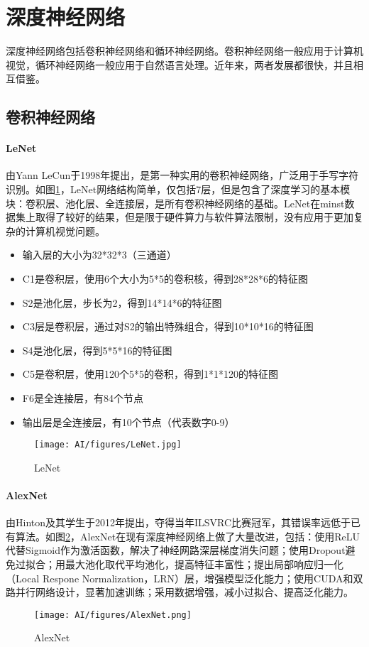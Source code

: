 \section{深度神经网络}
深度神经网络包括卷积神经网络和循环神经网络。卷积神经网络一般应用于计算机视觉，循环神经网络一般应用于自然语言处理。近年来，两者发展都很快，并且相互借鉴。
\subsection{卷积神经网络}
\paragraph{LeNet}\cite{lecun1998gradient}由Yann LeCun于1998年提出，是第一种实用的卷积神经网络，广泛用于手写字符识别。如图\ref{fig:lenet}，LeNet网络结构简单，仅包括7层，但是包含了深度学习的基本模块：卷积层、池化层、全连接层，是所有卷积神经网络的基础。LeNet在minst数据集上取得了较好的结果，但是限于硬件算力与软件算法限制，没有应用于更加复杂的计算机视觉问题。
\begin{itemize}
\item 输入层的大小为32*32*3（三通道）
\item C1是卷积层，使用6个大小为5*5的卷积核，得到28*28*6的特征图
\item S2是池化层，步长为2，得到14*14*6的特征图
\item C3层是卷积层，通过对S2的输出特殊组合，得到10*10*16的特征图
\item S4是池化层，得到5*5*16的特征图
\item C5是卷积层，使用120个5*5的卷积，得到1*1*120的特征图
\item F6是全连接层，有84个节点
\item 输出层是全连接层，有10个节点（代表数字0-9）
\end{itemize}
\begin{figure}
    \centering
    \texttt{[image: AI/figures/LeNet.jpg]}
    \caption{LeNet}
    \label{fig:lenet}
\end{figure}

\paragraph{AlexNet}\cite{krizhevsky2012imagenet}由Hinton及其学生于2012年提出，夺得当年ILSVRC比赛冠军，其错误率远低于已有算法。如图\ref{fig:alexnet}，AlexNet在现有深度神经网络上做了大量改进，包括：使用ReLU\cite{glorot2011deep}代替Sigmoid作为激活函数，解决了神经网路深层梯度消失问题；使用Dropout\cite{srivastava2014dropout,tinto1975dropout}避免过拟合；用最大池化\cite{nagi2011max}取代平均池化，提高特征丰富性；提出局部响应归一化（Local Respone Normalization，LRN）层，增强模型泛化能力；使用CUDA和双路并行网络设计，显著加速训练；采用数据增强，减小过拟合、提高泛化能力。
\begin{figure}
    \centering
    \texttt{[image: AI/figures/AlexNet.png]}
    \caption{AlexNet}
    \label{fig:alexnet}
\end{figure}

